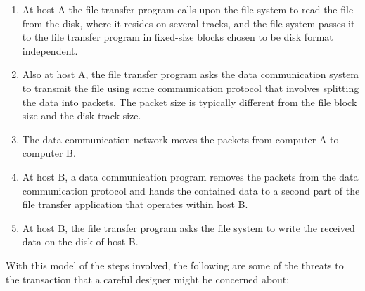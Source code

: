 \documentclass[a4paper,12pt,notitlepage,twoside,openright]{article}
\begin{document}
\begin{enumerate}[label=(\arabic*)]
\item

  At host A the file transfer program calls upon the file system to read
  the file from the disk, where it resides on several tracks, and the
  file system passes it to the file transfer program in fixed-size
  blocks chosen to be disk format independent.

\item

  Also at host A, the file transfer program asks the data communication
  system to transmit the file using some communication protocol that
  involves splitting the data into packets. The packet size is typically
  different from the file block size and the disk track size.

\item

  The data communication network moves the packets from computer A to
  computer B.

\item

  At host B, a data communication program removes the packets from the
  data communication protocol and hands the contained data to a second
  part of the file transfer application that operates within host B.

\item

  At host B, the file transfer program asks the file system to write the
  received data on the disk of host B.

\end{enumerate}

With this model of the steps involved, the following are some of the
threats to the transaction that a careful designer might be concerned
about:
\end{document}
